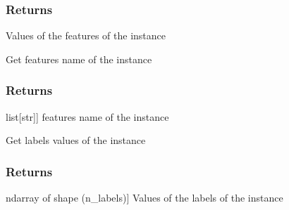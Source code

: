 \documentclass[letterpaper,10pt,english]{sphinxmanual}
\begin{document}
\begin{fulllineitems}
\begin{fulllineitems}
\subsubsection{Returns}
\label{\detokenize{data/_autosummary/miml.data.instance.Instance:id5}}\begin{description}
\sphinxAtStartPar
Values of the features of the instance

\end{description}

\end{fulllineitems}


\begin{fulllineitems}
\label{\detokenize{data/_autosummary/miml.data.instance.Instance:miml.data.instance.Instance.get_features_name}}
\pysigstartsignatures
{}
\pysigstopsignatures
\sphinxAtStartPar
Get features name of the instance


\subsubsection{Returns}
\label{\detokenize{data/_autosummary/miml.data.instance.Instance:id6}}\begin{description}
\sphinxlineitem{features}{[}list{[}str{]}{]}
\sphinxAtStartPar
features name of the instance

\end{description}

\end{fulllineitems}


\begin{fulllineitems}
\label{\detokenize{data/_autosummary/miml.data.instance.Instance:miml.data.instance.Instance.get_labels}}
\pysigstartsignatures
{}
\pysigstopsignatures
\sphinxAtStartPar
Get labels values of the instance


\subsubsection{Returns}
\label{\detokenize{data/_autosummary/miml.data.instance.Instance:id7}}\begin{description}
\sphinxlineitem{labels data}{[}ndarray of shape (n\_labels){]}
\sphinxAtStartPar
Values of the labels of the instance


\end{description}
\end{fulllineitems}
\end{fulllineitems}
\end{document}
